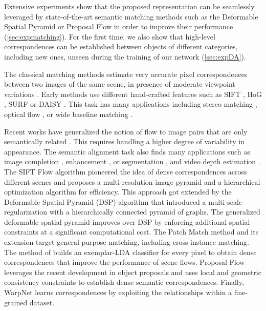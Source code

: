 \documentclass[10pt,twocolumn,letterpaper]{article}
\begin{document}
Extensive experiments show that the proposed representation can be seamlessly leveraged by state-of-the-art semantic matching methods such as the Deformable Spatial Pyramid \cite{kim2013deformable} or Proposal Flow \cite{ham2016} in order to improve their performance (\cref{sec:expmatching}). For the first time, we also show that high-level correspondences can be established between objects of different categories, including new ones, unseen during the training of our network (\cref{sec:expDA}).

The classical matching methods estimate very accurate pixel correspondences between two images of the same scene, in presence of moderate viewpoint variations \cite{horn93determining, matas02robust, okutomi1993}. Early methods use different hand-crafted features such as SIFT \cite{lowe2004sift}, HoG \cite{dalal05hog}, SURF \cite{bay2008surf} or DAISY \cite{Tola10daisy}. This task has many applications including stereo matching \cite{okutomi1993}, optical flow \cite{horn93determining,weinzaepfel13deepflow}, or wide baseline matching \cite{matas02robust,yang2014daisyfilterflow}.

Recent works have generalized the notion of flow to image pairs that are only semantically related \cite{liu11siftflow,qui14scale,kim2013deformable,tau15dense,ham2016}. This requires handling a higher degree of variability in appearance. 
The semantic alignment task also finds many applications such as image completion \cite{barnes10patchmatch}, enhancement \cite{hacohen2011non}, or segmentation \cite{liu11siftflow}, and video depth estimation \cite{karsch2012depth}.
The SIFT Flow algorithm \cite{liu08siftflow,liu11siftflow} pioneered the idea of dense correspondences across different scenes and proposes a multi-resolution image pyramid and a hierarchical optimization algorithm for efficiency. This approach got extended by the Deformable Spatial Pyramid (DSP) algorithm \cite{kim2013deformable} that introduced a multi-scale regularization with a hierarchically connected pyramid of graphs. The generalized deformable spatial pyramid \cite{hur15generalized} improves over DSP by enforcing additional spatial constraints at a significant computational cost. 
The Patch Match method \cite{barnes09patchmatch} and its extension \cite{barnes10patchmatch} target general purpose matching, including cross-instance matching.
The method of \cite{bristow2015dense} builds an exemplar-LDA classifier for every pixel to obtain dense correspondences that improve the performance of scene flows.
Proposal Flow \cite{ham2016} leverages the recent development in object proposals and uses local and geometric consistency constraints to establish dense semantic correspondences.
Finally, WarpNet \cite{kanazawa16warpnet} learns correspondences by exploiting the relationships within a fine-grained dataset. 
\end{document}
